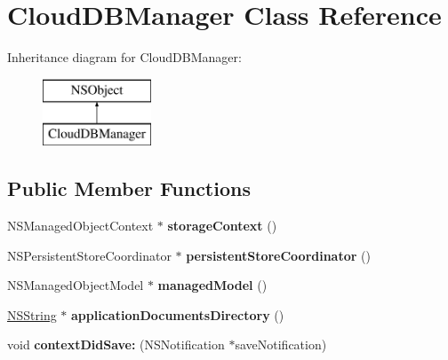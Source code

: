 \hypertarget{interface_cloud_d_b_manager}{
\section{\-Cloud\-D\-B\-Manager \-Class \-Reference}
\label{interface_cloud_d_b_manager}
}
\-Inheritance diagram for \-Cloud\-D\-B\-Manager\-:\begin{figure}[H]
\begin{center}
\leavevmode
\includegraphics[height=2.000000cm]{interface_cloud_d_b_manager}
\end{center}
\end{figure}
\subsection*{\-Public \-Member \-Functions}
\begin{DoxyCompactItemize}
\item 
\hypertarget{interface_cloud_d_b_manager_aa507224186092847810e4eafbc32f4f8}{
\-N\-S\-Managed\-Object\-Context $\ast$ {\bfseries storage\-Context} ()}
\label{interface_cloud_d_b_manager_aa507224186092847810e4eafbc32f4f8}

\item 
\hypertarget{interface_cloud_d_b_manager_a6cd9c78a9538f72c2a5948939c737094}{
\-N\-S\-Persistent\-Store\-Coordinator $\ast$ {\bfseries persistent\-Store\-Coordinator} ()}
\label{interface_cloud_d_b_manager_a6cd9c78a9538f72c2a5948939c737094}

\item 
\hypertarget{interface_cloud_d_b_manager_abbab662a92defb3dce9caed61b819bd0}{
\-N\-S\-Managed\-Object\-Model $\ast$ {\bfseries managed\-Model} ()}
\label{interface_cloud_d_b_manager_abbab662a92defb3dce9caed61b819bd0}

\item 
\hypertarget{interface_cloud_d_b_manager_a56d373e0130a6dafe8f6c35488c7a15d}{
\hyperlink{class_n_s_string}{\-N\-S\-String} $\ast$ {\bfseries application\-Documents\-Directory} ()}
\label{interface_cloud_d_b_manager_a56d373e0130a6dafe8f6c35488c7a15d}

\item 
\hypertarget{interface_cloud_d_b_manager_a676333ea588abc2e27d2960ce7be920b}{
void {\bfseries context\-Did\-Save\-:} (\-N\-S\-Notification $\ast$save\-Notification)}
\label{interface_cloud_d_b_manager_a676333ea588abc2e27d2960ce7be920b}

\end{DoxyCompactItemize}
